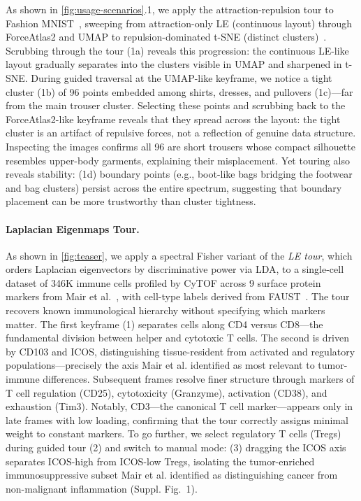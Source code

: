 \documentclass{vgtc}
\begin{document}
As shown in \autoref{fig:usage-scenarios}.1, we apply the attraction-repulsion tour to Fashion MNIST~\cite{xiao2017fashion}, sweeping from attraction-only LE (continuous layout) through ForceAtlas2 and UMAP to repulsion-dominated t-SNE (distinct clusters)~\cite{boehm2022attraction}. Scrubbing through the tour (1a) reveals this progression: the continuous LE-like layout gradually separates into the clusters visible in UMAP and sharpened in t-SNE. During guided traversal at the UMAP-like keyframe, we notice a tight cluster (1b) of 96 points embedded among shirts, dresses, and pullovers (1c)---far from the main trouser cluster. Selecting these points and scrubbing back to the ForceAtlas2-like keyframe reveals that they spread across the layout: the tight cluster is an artifact of repulsive forces, not a reflection of genuine data structure. Inspecting the images confirms all 96 are short trousers whose compact silhouette resembles upper-body garments, explaining their misplacement. Yet touring also reveals stability: (1d) boundary points (e.g., boot-like bags bridging the footwear and bag clusters) persist across the entire spectrum, suggesting that boundary placement can be more trustworthy than cluster tightness.

\paragraph{Laplacian Eigenmaps Tour.}
\label{sec:laplacian-eigenmaps-tour}

As shown in \autoref{fig:teaser}, we apply a spectral Fisher variant of the \emph{LE tour}, which orders Laplacian eigenvectors by discriminative power via LDA, to a single-cell dataset of 346K immune cells profiled by CyTOF across 9 surface protein markers from Mair et al.~\cite{mair2022extricating}, with cell-type labels derived from FAUST~\cite{greene2021new}. The tour recovers known immunological hierarchy without specifying which markers matter. The first keyframe (1) separates cells along CD4 versus CD8---the fundamental division between helper and cytotoxic T cells. The second is driven by CD103 and ICOS, distinguishing tissue-resident from activated and regulatory populations---precisely the axis Mair et al. identified as most relevant to tumor-immune differences. Subsequent frames resolve finer structure through markers of T cell regulation (CD25), cytotoxicity (Granzyme), activation (CD38), and exhaustion (Tim3). Notably, CD3---the canonical T cell marker---appears only in late frames with low loading, confirming that the tour correctly assigns minimal weight to constant markers. To go further, we select regulatory T cells (Tregs) during guided tour (2) and switch to manual mode: (3) dragging the ICOS axis separates ICOS-high from ICOS-low Tregs, isolating the tumor-enriched immunosuppressive subset Mair et al. identified as distinguishing cancer from non-malignant inflammation (Suppl. Fig.~1).
\end{document}
